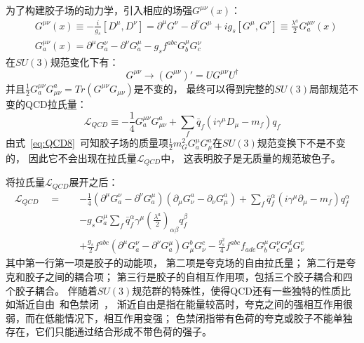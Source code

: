 为了构建胶子场的动力学，引入相应的场强$G^{\mu\nu}(x)$：
\begin{equation} 
\label{eq:QCD10}
 \begin{split}
  & G^{\mu\nu}(x) \equiv -\frac{i}{g_s}\left[D^{\mu},D^{\nu} \right] = \partial^{\mu}G^{\nu}-\partial^{\nu}G^{\mu} +i g_s\left[G^{\mu},G^{\nu} \right]
   \equiv \frac{\lambda^{a}}{2}G^{\mu\nu}_a(x)
   \\
&   G^{\mu\nu}_a(x)= \partial^{\mu}G^{\nu}_a-\partial^{\nu}G^{\mu}_a -g_sf^{abc}G^{\mu}_bG^{\nu}_c 
 \end{split}
\end{equation}
在$SU(3)$规范变化下有：
\begin{equation} 
\label{eq:QCD11}
G^{\mu\nu} \rightarrow  (G^{\mu\nu})'=UG^{\mu\nu}U^{\dagger}
\end{equation}
并且$\frac{1}{2}G^{\mu\nu}_a G^a_{\mu\nu}=Tr(G^{\mu\nu}G_{\mu\nu})$是不变的，
最终可以得到完整的$SU(3)$局部规范不变的QCD拉氏量：
\begin{equation} 
\label{eq:QCD12}
\mathcal{L}_{QCD}  \equiv  -\frac{1}{4}G^{\mu\nu}_a G_{\mu\nu}^a +\sum_f \bar{q}_f (i\gamma^{\mu}D_{\mu}-m_f)q_f
\end{equation}
由式~\ref{eq:QCD8}~可知胶子场的质量项$\frac{1}{2}m^2_G G^{\mu}_a G^a_{\mu}$在$SU(3)$规范变换下不是不变的，
因此它不会出现在拉氏量$\mathcal{L}_{QCD}$中，
这表明胶子是无质量的规范玻色子。

将拉氏量$\mathcal{L}_{QCD}$展开之后：
\begin{equation} 
\label{eq:QCD13}
 \begin{split}
   \mathcal{L}_{QCD}  \quad = \quad & -\frac{1}{4} (\partial^{\mu}G^{\nu}_a-\partial^{\nu}G^{\mu}_a) (\partial_{\mu}G_{\nu}^a-\partial_{\nu}G_{\mu}^a)+
   \sum_f \bar{q}^{\alpha}_f (i\gamma^{\mu}\partial_{\mu}-m_f)q^{\alpha}_f
   \\
  & -g_s G^{\mu}_a \sum_f \bar{q}^{\alpha}_f \gamma^{\mu} \left( \frac{\lambda^{a}}{2} \right)_{\alpha\beta} q^{\beta}_f
   \\
  & +\frac{g_s}{2} f^{abc} (\partial^{\mu}G^{\nu}_a-\partial^{\nu}G^{\mu}_a) G^b_{\mu} G^c_{\nu} 
   -\frac{g_s^2}{4} f^{abc} f_{ade} G_b^{\mu} G_c^{\nu}  G^d_{\mu} G^e_{\nu} 
 \end{split}
\end{equation}
其中第一行第一项是胶子的动能项，
第二项是夸克场的自由拉氏量；
第二行是夸克和胶子之间的耦合项；
第三行是胶子的自相互作用项，包括三个胶子耦合和四个胶子耦合。
伴随着$SU(3)$规范群的特殊性，使得QCD还有一些独特的性质比如渐近自由~\cite{ASF1,ASF2}和色禁闭~\cite{CONF}，
渐近自由是指在能量较高时，夸克之间的强相互作用很弱，而在低能情况下，相互作用变强；
色禁闭指带有色荷的夸克或胶子不能单独存在，它们只能通过结合形成不带色荷的强子。

